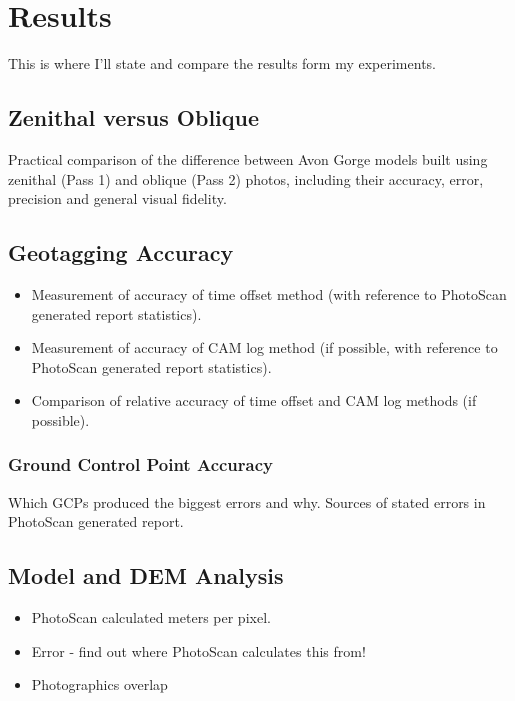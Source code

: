\section{Results}

This is where I'll state and compare the results form my experiments.

\subsection{Zenithal versus Oblique}
\label{subsec:results/zenithal-versus-oblique}

Practical comparison of the difference between Avon Gorge models built using
zenithal (Pass 1) and oblique (Pass 2) photos, including their accuracy, error,
precision and general visual fidelity.

\subsection{Geotagging Accuracy}

\begin{itemize}

    \item Measurement of accuracy of time offset method (with reference to
        PhotoScan generated report statistics).

    \item Measurement of accuracy of CAM log method (if possible, with reference
        to PhotoScan generated report statistics).

    \item Comparison of relative accuracy of time offset and CAM log methods (if
        possible).

\end{itemize}

\subsubsection{Ground Control Point Accuracy}

Which GCPs produced the biggest errors and why. Sources of stated errors in
PhotoScan generated report.

\subsection{Model and DEM Analysis}

\begin{itemize}

    \item PhotoScan calculated meters per pixel.

    \item Error - find out where PhotoScan calculates this from!

    \item Photographics overlap

\end{itemize}
